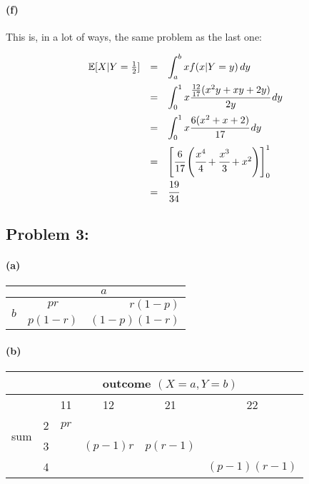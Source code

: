 \documentclass[a4paper]{article}
\begin{document}
\paragraph{(f)} This is, in a lot of ways, the same problem as the last one:

\begin{equation}
\begin{array}{rcl}
\mathbb{E}[X | Y = \frac{1}{2}] & = & \displaystyle\int^{b}_{a} x f(x | Y = y) \,dy \\[.15in]
& = & \displaystyle\int^{1}_{0} x \cfrac{\frac{12}{17} (x^2y + xy + 2y)}{2y} \,dy \\[.15in]
& = & \displaystyle\int^{1}_{0} x \cfrac{6 (x^2 + x + 2)}{17}  \,dy \\[.15in]
& = & \begin{bmatrix} \cfrac{6}{17} \left( \cfrac{x^4}{4} + \cfrac{x^3}{3} + x^2 \right) \end{bmatrix}^{1}_{0} \\[.15in]
& = & \cfrac{19}{34}
\end{array}
\end{equation}

\subsection*{Problem 3:}

\paragraph{(a)}

\renewcommand\arraystretch{1.5}
\begin{tabular}{ c || c | r }
& \multicolumn{2}{c}{$a$} \\
\hline
\hline
\multirow{2}{*}{$b$} & $pr$ & $r(1-p)$ \\
\cline{2-3}
& $p(1-r)$ & $(1-p)(1-r)$ \\
\end{tabular}

\paragraph{(b)}
\renewcommand\arraystretch{1.5}
\begin{tabular}{ c | c | c | c | c | c }
& \multicolumn{5}{c}{outcome $(X = a, Y = b)$} \\
\hline
\multirow{4}{*}{sum} & & 11 & 12 & 21 & 22 \\
\cline{2-6}
& 2 & $pr$ & & & \\
\cline{2-6}
& 3 & & $(p-1)r$ & $p(r-1)$ & \\
\cline{2-6}
& 4 & & & & $(p-1)(r-1)$ \\
\end{tabular}
\end{document}
